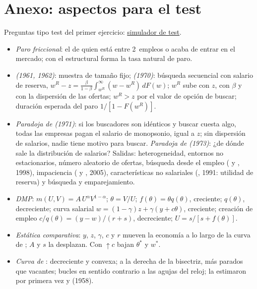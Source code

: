\documentclass[11pt]{article}
\begin{document}
\section{Anexo: aspectos para el test}\label{anexo:test}

\begin{anotaciones}
Preguntas tipo test del primer ejercicio: \href{https://www.victorgutierrezmarcos.es/oposicion/temario/primer-ejercicio/test/simulador.html?tema=3.A.26}{simulador de test}.
\end{anotaciones}

\begin{itemize}
\item \emph{Paro friccional}: el de quien está entre 2~empleos o acaba de entrar en el mercado; con el estructural forma la tasa natural de paro.
\item \emph{ (1961, 1962)}: muestra de tamaño fijo; \emph{ (1970)}: búsqueda secuencial con salario de reserva, $w^R-z=\frac{\beta}{1-\beta}\int_{w^R}^{\infty}(w-w^R)\,dF(w)$; $w^R$ sube con $z$, con $\beta$ y con la dispersión de las ofertas; $w^R>z$ por el valor de opción de buscar; duración esperada del paro $1/[1-F(w^R)]$.
\item \emph{Paradoja de  (1971)}: si los buscadores son idénticos y buscar cuesta algo, todas las empresas pagan el salario de monopsonio, igual a $z$; sin dispersión de salarios, nadie tiene motivo para buscar. \emph{Paradoja de  (1973)}: ¿de dónde sale la distribución de salarios? Salidas: heterogeneidad, entornos no estacionarios, número aleatorio de ofertas, búsqueda desde el empleo ( y , 1998), impaciencia ( y , 2005), características no salariales (, 1991: utilidad de reserva) y búsqueda y emparejamiento.
\item \emph{DMP}: $m(U,V)=A\,U^{\alpha}V^{1-\alpha}$; $\theta=V/U$; $f(\theta)=\theta q(\theta)$, creciente; $q(\theta)$, decreciente; curva salarial $w=(1-\gamma)z+\gamma(y+c\theta)$, creciente; creación de empleo $c/q(\theta)=(y-w)/(r+s)$, decreciente; $U=s/[s+f(\theta)]$.
\item \emph{Estática comparativa}: $y$, $z$, $\gamma$, $c$ y $r$ mueven la economía a lo largo de la curva de ; $A$ y $s$ la desplazan. Con $\uparrow c$ bajan $\theta^*$ y $w^*$.
\item \emph{Curva de }: decreciente y convexa; a la derecha de la bisectriz, más parados que vacantes; bucles en sentido contrario a las agujas del reloj; la estimaron por primera vez  y  (1958).

\end{itemize}
\end{document}
